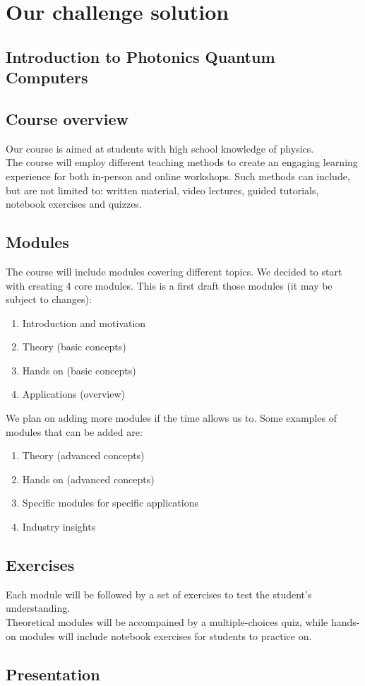 \documentclass[hidelinks, a4paper,12pt]{article}
\begin{document}
\newpage
\section{Our challenge solution}

\subsection*{Introduction to Photonics Quantum Computers}
\subsection{Course overview}
Our course is aimed at students with high school knowledge of physics.\\The course will employ different teaching methods to create an engaging learning experience for both in-person and online workshops. Such methods can include, but are not limited to: written material, video lectures, guided tutorials, notebook exercises and quizzes.
\subsection{Modules}
The course will include modules covering different topics. We decided to start with creating 4 core modules. This is a first draft those modules (it may be subject to changes):
\begin{enumerate}
  \item Introduction and motivation
  \item Theory (basic concepts)
  \item Hands on (basic concepts)
  \item Applications (overview)
\end{enumerate}
We plan on adding more modules if the time allows us to. Some examples of modules that can be added are:
\begin{enumerate}
  \item Theory (advanced concepts)
  \item Hands on (advanced concepts)
  \item Specific modules for specific applications
  \item Industry insights
\end{enumerate}
\subsection{Exercises}
Each module will be followed by a set of exercises to test the student's understanding.\\ Theoretical modules will be accompained by a multiple-choices quiz, while hands-on modules will include notebook exercises for students to practice on.

\subsection{Presentation}
\end{document}

